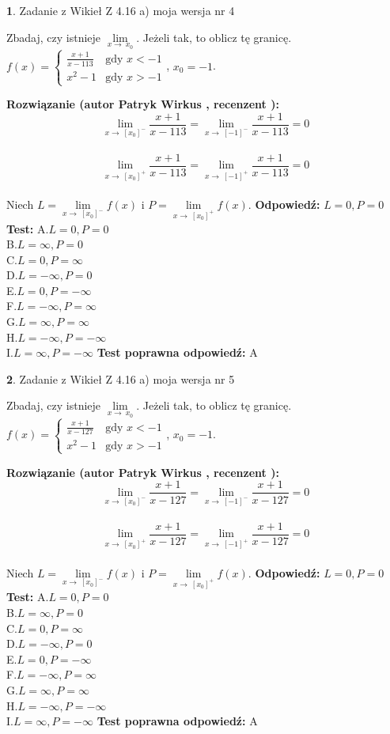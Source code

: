 \documentclass[12pt, a4paper]{article}
\theoremstyle{definition} %
\newtheorem{zad}{}
\newcommand{\zadStart}[1]{\begin{zad}#1\newline}
\newcommand{\zadStop}{\end{zad}}
\newcommand{\rozwStart}[2]{\noindent \textbf{Rozwiązanie (autor #1 , recenzent #2): }\newline}
\newcommand{\rozwStop}{\newline}
\newcommand{\odpStart}{\noindent \textbf{Odpowiedź:}\newline}
\newcommand{\odpStop}{\newline}
\newcommand{\testStart}{\noindent \textbf{Test:}\newline}
\newcommand{\testStop}{\newline}
\newcommand{\kluczStart}{\noindent \textbf{Test poprawna odpowiedź:}\newline}
\newcommand{\kluczStop}{\newline}
\begin{document}
\zadStart{Zadanie z Wikieł Z 4.16 a) moja wersja nr 4}

Zbadaj, czy istnieje $\lim\limits_{x\to\ x_{0}}$. Jeżeli tak, to oblicz tę granicę.\\   $f(x) = \left\{ \begin{array}{ll}
\frac{x+1}{x-113} & \textrm{gdy $x<-1$}\\
x^{2}-1 & \textrm{gdy $x>-1$}
\end{array} \right.$, $x_{0}=-1$.
\zadStop
\rozwStart{Patryk Wirkus}{}
$$\lim\limits_{x\to\ [x_{0}]^{-}}\frac{x+1}{x-113} = \lim\limits_{x\to\ [-1]^{-}}\frac{x+1}{x-113} = 0$$
\\
$$\lim\limits_{x\to\ [x_{0}]^{+}}\frac{x+1}{x-113} = \lim\limits_{x\to\ [-1]^{+}}\frac{x+1}{x-113} = 0$$
\\
Niech $L=\lim\limits_{x\to\ [x_{0}]^{-}}f(x)$ i $P=\lim\limits_{x\to\ [x_{0}]^{+}}f(x)$.
\rozwStop
\odpStart
$L=0, P=0$
\odpStop
\testStart
A.$L=0, P=0$\\ B.$L=\infty, P=0$\\ C.$L=0, P=\infty$\\ D.$L=-\infty, P=0$\\ E.$L=0, P=-\infty$\\
F.$L=-\infty, P=\infty$\\ G.$L=\infty, P=\infty$\\
H.$L=-\infty, P=-\infty$\\
I.$L=\infty, P=-\infty$
\testStop
\kluczStart
A
\kluczStop



\zadStart{Zadanie z Wikieł Z 4.16 a) moja wersja nr 5}

Zbadaj, czy istnieje $\lim\limits_{x\to\ x_{0}}$. Jeżeli tak, to oblicz tę granicę.\\   $f(x) = \left\{ \begin{array}{ll}
\frac{x+1}{x-127} & \textrm{gdy $x<-1$}\\
x^{2}-1 & \textrm{gdy $x>-1$}
\end{array} \right.$, $x_{0}=-1$.
\zadStop
\rozwStart{Patryk Wirkus}{}
$$\lim\limits_{x\to\ [x_{0}]^{-}}\frac{x+1}{x-127} = \lim\limits_{x\to\ [-1]^{-}}\frac{x+1}{x-127} = 0$$
\\
$$\lim\limits_{x\to\ [x_{0}]^{+}}\frac{x+1}{x-127} = \lim\limits_{x\to\ [-1]^{+}}\frac{x+1}{x-127} = 0$$
\\
Niech $L=\lim\limits_{x\to\ [x_{0}]^{-}}f(x)$ i $P=\lim\limits_{x\to\ [x_{0}]^{+}}f(x)$.
\rozwStop
\odpStart
$L=0, P=0$
\odpStop
\testStart
A.$L=0, P=0$\\ B.$L=\infty, P=0$\\ C.$L=0, P=\infty$\\ D.$L=-\infty, P=0$\\ E.$L=0, P=-\infty$\\
F.$L=-\infty, P=\infty$\\ G.$L=\infty, P=\infty$\\
H.$L=-\infty, P=-\infty$\\
I.$L=\infty, P=-\infty$
\testStop
\kluczStart
A
\kluczStop
\end{document}
